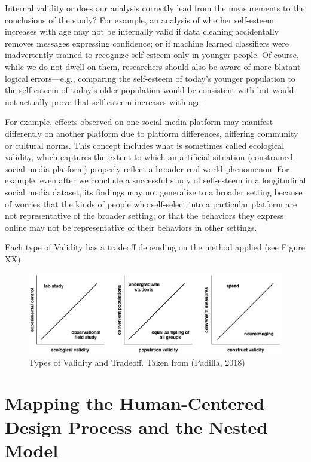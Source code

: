 \documentclass[
]{book}
\begin{document}
Internal validity or does our analysis correctly lead from the measurements to the conclusions of the study? For example, an analysis of whether self-esteem increases with age may not be internally valid if data cleaning accidentally removes messages expressing confidence; or if machine learned classifiers were inadvertently trained to recognize self-esteem only in younger people. Of course, while we do not dwell on them, researchers should also be aware of more blatant logical errors---e.g., comparing the self-esteem of today's younger population to the self-esteem of today's older population would be consistent with but would not actually prove that self-esteem increases with age.

For example, effects observed on one social media platform may manifest differently on another platform due to platform differences, differing community or cultural norms. This concept includes what is sometimes called ecological validity, which captures the extent to which an artificial situation (constrained social media platform) properly reflect a broader real-world phenomenon. For example, even after we conclude a successful study of self-esteem in a longitudinal social media dataset, its findings may not generalize to a broader setting because of worries that the kinds of people who self-select into a particular platform are not representative of the broader setting; or that the behaviors they express online may not be representative of their behaviors in other settings.

Each type of Validity has a tradeoff depending on the method applied (see Figure XX).

\begin{figure}

{\centering \includegraphics[width=1\linewidth]{images/tradeoff_validity} 

}

\caption{Types of Validity and Tradeoff. Taken from (Padilla, 2018)}\label{fig:unnamed-chunk-4}
\end{figure}

\hypertarget{mapping-the-human-centered-design-process-and-the-nested-model}{%
\section{Mapping the Human-Centered Design Process and the Nested Model}\label{mapping-the-human-centered-design-process-and-the-nested-model}}
\end{document}
